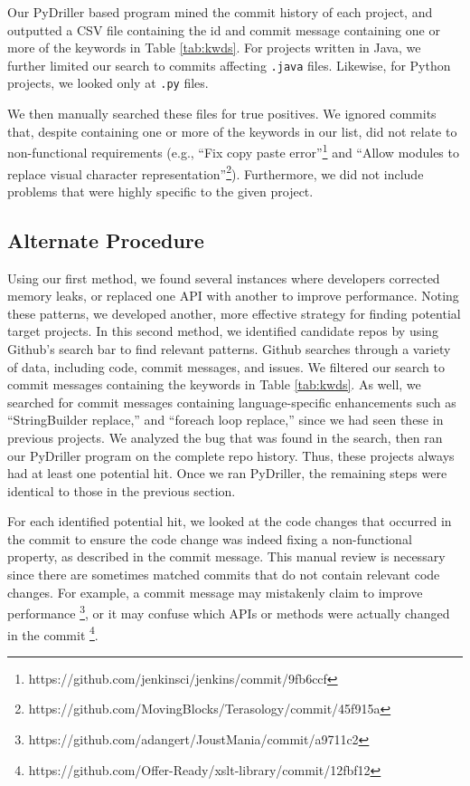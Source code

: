 \documentclass[sigconf]{acmart}
\begin{document}
Our PyDriller based program mined the commit history of each project, and outputted a CSV file containing the id and commit message containing one or more of the keywords in Table \ref{tab:kwds}. For projects written in Java, we further limited our search to commits affecting \texttt{.java} files. Likewise, for Python projects, we looked only at \texttt{.py} files.

We then manually searched these files for true positives. We ignored commits that, despite containing one or more of the keywords in our list, did not relate to non-functional requirements (e.g., ``Fix copy paste error''\footnote{https://github.com/jenkinsci/jenkins/commit/9fb6ccf} and ``Allow modules to replace visual character representation''\footnote{https://github.com/MovingBlocks/Terasology/commit/45f915a}). Furthermore, we did not include problems that were highly specific to the given project. 


\subsection{Alternate Procedure}
Using our first method, we found several instances where developers corrected memory leaks, or replaced one API with another to improve performance. Noting these patterns, we developed another, more effective strategy for finding  potential target projects. In this second method, we identified candidate repos by using Github's search bar to find relevant patterns. Github searches through a variety of data, including code, commit messages, and issues. We filtered our search to commit messages containing the keywords in Table \ref{tab:kwds}. As well, we searched for commit messages containing language-specific enhancements such as ``StringBuilder replace,'' and ``foreach loop replace,'' since we had seen these in previous projects. We analyzed the bug that was found in the search, then ran our PyDriller program on the complete repo history. Thus, these projects always had at least one potential hit. Once we ran PyDriller, the remaining steps were identical to those in the previous section.

For each identified potential hit, we looked at the code changes that occurred in the commit to ensure the code change was indeed fixing a non-functional property, as described in the commit message. This manual review is necessary since there are sometimes matched commits that do not contain relevant code changes. For example, a commit message may mistakenly claim to improve performance \footnote{https://github.com/adangert/JoustMania/commit/a9711c2}, or it may confuse which APIs or methods were actually changed in the commit \footnote{https://github.com/Offer-Ready/xslt-library/commit/12fbf12}.
\end{document}
